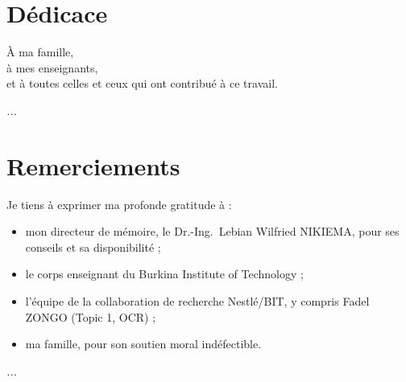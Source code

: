 \documentclass[12pt]{report}
\newcommand{\todo}[1]{\textsl{\colorbox[rgb]{1,1,0}{#1}}}
\begin{document}
\section*{Dédicace}
\setcounter{page}{2}
\thispagestyle{fancy}
\vspace{2cm}
\begin{center}
À ma famille,\\
à mes enseignants,\\
et à toutes celles et ceux qui ont contribué à ce travail.
\end{center}
\todo{ ...}
\newpage
{}
\section*{Remerciements}
Je tiens à exprimer ma profonde gratitude à :
\begin{itemize}
    \item mon directeur de mémoire, le Dr.-Ing.\ Lebian Wilfried NIKIEMA, pour ses conseils et sa disponibilité ;
    \item le corps enseignant du Burkina Institute of Technology ;
    \item l'équipe de la collaboration de recherche Nestl\'e/BIT, y compris Fadel ZONGO (Topic 1, OCR) ;
    \item ma famille, pour son soutien moral indéfectible.
\end{itemize}
\todo{ ...}
\thispagestyle{fancy}
\newpage
{}
\end{document}
